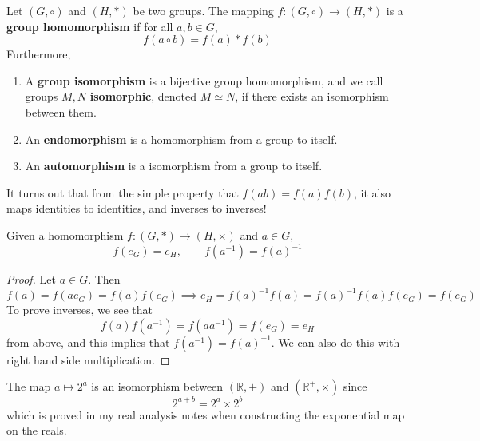   \begin{definition}
    Let $(G, \circ)$ and $(H, *)$ be two groups. The mapping $f: (G, \circ) \longrightarrow (H, *)$ is a \textbf{group homomorphism} if for all $a, b \in G$, 
    \begin{equation}
      f(a \circ b) = f(a) * f(b)
    \end{equation} 
    Furthermore, 
    \begin{enumerate}
      \item A \textbf{group isomorphism} is a bijective group homomorphism, and we call groups $M, N$ \textbf{isomorphic}, denoted $M \simeq N$, if there exists an isomorphism between them. 
      \item An \textbf{endomorphism} is a homomorphism from a group to itself. 
      \item An \textbf{automorphism} is a isomorphism from a group to itself. 
    \end{enumerate}
  \end{definition} 

  It turns out that from the simple property that $f(ab) = f(a) f(b)$, it also maps identities to identities, and inverses to inverses!  

  \begin{lemma}
    Given a homomorphism $f: (G, \ast) \rightarrow (H, \times)$ and $a \in G$, 
    \begin{equation}
      f(e_G) = e_H, \qquad f(a^{-1}) = f(a)^{-1}
    \end{equation}
  \end{lemma}
  \begin{proof}
    Let $a \in G$. Then 
    \begin{equation}
      f(a) = f(a e_G) = f(a) f(e_G) \implies e_H = f(a)^{-1} f(a) = f(a)^{-1} f(a) f(e_G) = f(e_G)
    \end{equation}
    To prove inverses, we see that 
    \begin{equation}
      f(a) f(a^{-1}) = f(a a^{-1}) = f(e_G) = e_H
    \end{equation}
    from above, and this implies that $f(a^{-1}) = f(a)^{-1}$. We can also do this with right hand side multiplication. 
  \end{proof}

  \begin{example}
    The map $a \mapsto 2^{a}$ is an isomorphism between $(\mathbb{R}, +)$ and $(\mathbb{R}^{+}, \times)$ since 
    \begin{equation}
      2^{a+b} = 2^a \times 2^b
    \end{equation} 
    which is proved in my real analysis notes when constructing the exponential map on the reals. 
  \end{example} 

